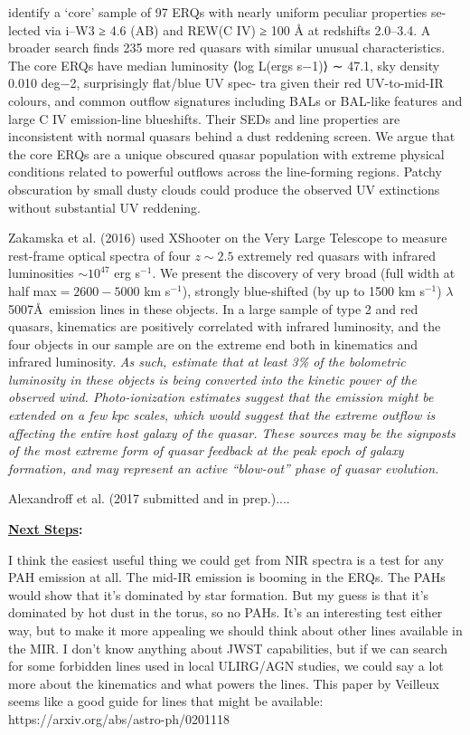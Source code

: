 identify a ‘core’ sample of 97 ERQs with nearly uniform peculiar
properties se- lected via i–W3 ≥ 4.6 (AB) and REW(C IV) ≥ 100 Å at
redshifts 2.0–3.4. A broader search finds 235 more red quasars with
similar unusual characteristics. The core ERQs have median luminosity
⟨log L(ergs s−1)⟩ ∼ 47.1, sky density 0.010 deg−2, surprisingly
flat/blue UV spec- tra given their red UV-to-mid-IR colours, and
common outflow signatures including BALs or BAL-like features and
large C IV emission-line blueshifts. Their SEDs and line properties
are inconsistent with normal quasars behind a dust reddening
screen. We argue that the core ERQs are a unique obscured quasar
population with extreme physical conditions related to powerful
outflows across the line-forming regions. Patchy obscuration by small
dusty clouds could produce the observed UV extinctions without
substantial UV reddening.

\smallskip
\smallskip
\noindent
Zakamska et al. (2016) used XShooter on the Very Large Telescope to measure rest-frame optical spectra of four $z\sim 2.5$ extremely red quasars with infrared luminosities $\sim 10^{47}$ erg s$^{-1}$. We present the discovery of very broad (full width at half max$= 2600-5000$ km s$^{-1}$), strongly blue-shifted (by up to 1500 km s$^{-1}$) \oiii$\lambda$5007\AA\ emission lines in these objects. In a large sample of type 2 and red quasars, \oiii kinematics are positively correlated with infrared luminosity, and the four objects in our sample are on the extreme end both in \oiii kinematics and infrared luminosity. 
{\it As such, estimate that at least 3\% of the bolometric luminosity in these objects is being converted into the kinetic power of the observed wind. Photo-ionization estimates suggest that the \oiii emission might be extended on a few kpc scales, which would suggest that the extreme outflow is affecting the entire host galaxy of the quasar. These sources may be the signposts of the most extreme form of quasar feedback at the peak epoch of galaxy formation, and may represent an active ``blow-out'' phase of quasar evolution. }

\smallskip
\smallskip
\noindent
Alexandroff et al. (2017 submitted and in prep.)....



\medskip
\medskip
\smallskip
\smallskip
\noindent
{\bf \underline{Next Steps}:}

I think the easiest useful thing we could get from NIR spectra is a test for any PAH emission at all. The mid-IR emission is booming in the ERQs. The PAHs would show that it's dominated by star formation. But my guess is that it’s dominated by hot dust in the torus, so no PAHs. It’s an interesting test either way, but to make it more appealing we should think about other lines available in the MIR. I don’t know anything about JWST capabilities, but if we can search for some forbidden lines used in local ULIRG/AGN studies, we could say a lot more about the kinematics and what powers the lines. This paper by Veilleux seems like a good guide for lines that might be available: https://arxiv.org/abs/astro-ph/0201118



